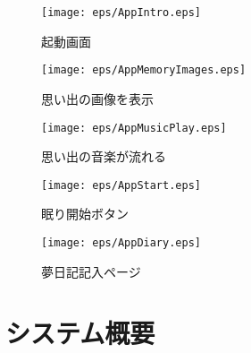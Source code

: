 \begin{figure}[htbp]
 \begin{minipage}{0.45\hsize}
  \begin{center}
   \texttt{[image: eps/AppIntro.eps]}
  \end{center}
  \caption{起動画面}
  \label{le01}
 \end{minipage}
 \begin{minipage}{0.45\hsize}
  \begin{center}
   \texttt{[image: eps/AppMemoryImages.eps]}
  \end{center}
  \caption{思い出の画像を表示}
  \label{le02}
 \end{minipage}
\end{figure}

\begin{figure}[htbp]
 \begin{minipage}{0.45\hsize}
  \begin{center}
   \texttt{[image: eps/AppMusicPlay.eps]}
  \end{center}
  \caption{思い出の音楽が流れる}
  \label{le03}
 \end{minipage}
 \begin{minipage}{0.45\hsize}
  \begin{center}
   \texttt{[image: eps/AppStart.eps]}
  \end{center}
  \caption{眠り開始ボタン}
  \label{le04}
 \end{minipage}
\end{figure}

\begin{figure}[htbp]
 \begin{minipage}{0.45\hsize}
  \begin{center}
   \texttt{[image: eps/AppDiary.eps]}
  \end{center}
  \caption{夢日記記入ページ}
  \label{le05}
 \end{minipage}
 \begin{minipage}{0.45\hsize}
 \end{minipage}
\end{figure}

\section{システム概要}
